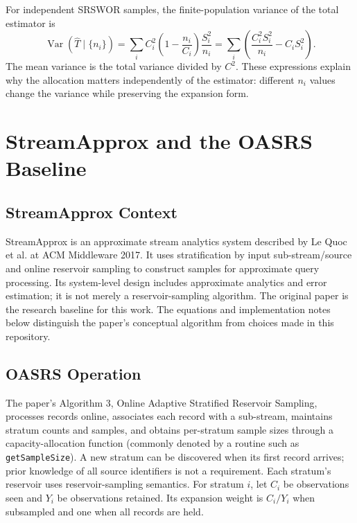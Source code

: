 \documentclass[11pt]{article}
\begin{document}
For independent SRSWOR samples, the finite-population variance of the total estimator is
\begin{equation}
 \operatorname{Var}(\widehat{T}\mid\{n_i\})
 =\sum_i C_i^2\left(1-\frac{n_i}{C_i}\right)\frac{S_i^2}{n_i}
 =\sum_i\left(\frac{C_i^2S_i^2}{n_i}-C_iS_i^2\right).
 \label{eq:strat-var}
\end{equation}
The mean variance is the total variance divided by $C^2$. These expressions explain why the allocation matters independently of the estimator: different $n_i$ values change the variance while preserving the expansion form.

\section{StreamApprox and the OASRS Baseline}

\subsection{StreamApprox Context}

StreamApprox is an approximate stream analytics system described by Le Quoc et al. at ACM Middleware 2017. It uses stratification by input sub-stream/source and online reservoir sampling to construct samples for approximate query processing. Its system-level design includes approximate analytics and error estimation; it is not merely a reservoir-sampling algorithm. The original paper is the research baseline for this work. The equations and implementation notes below distinguish the paper's conceptual algorithm from choices made in this repository.

\subsection{OASRS Operation}

The paper's Algorithm 3, Online Adaptive Stratified Reservoir Sampling, processes records online, associates each record with a sub-stream, maintains stratum counts and samples, and obtains per-stratum sample sizes through a capacity-allocation function (commonly denoted by a routine such as \texttt{getSampleSize}). A new stratum can be discovered when its first record arrives; prior knowledge of all source identifiers is not a requirement. Each stratum's reservoir uses reservoir-sampling semantics. For stratum $i$, let $C_i$ be observations seen and $Y_i$ be observations retained. Its expansion weight is $C_i/Y_i$ when subsampled and one when all records are held.
\end{document}
